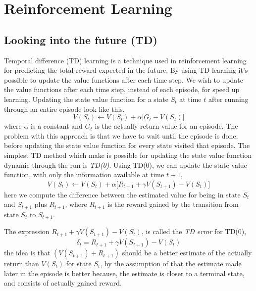 \documentclass[11pt]{article}
\begin{document}
\maketitle

\section{Reinforcement Learning}



\subsection{Looking into the future (TD)}

Temporal difference (TD) learning is a technique used in reinforcement learning for predicting the total reward expected in the future. By using TD learning it's possible to update the value functions after each time step. We wish to update the value functions after each time step, instead of each episode, for speed up learning. Updating the state value function for a state $S_{t}$ at time $t$ after running through an entire episode look like this,
\begin{equation}\label{eq:td}
    V(S_{t}) \leftarrow V(S_{t}) + \alpha \big[G_{t} - V(S_{t}) \big]
\end{equation}
where $\alpha$ is a constant and $G_{t}$ is the actually return value for an episode. The problem with this approach is that we have to wait until the episode is done, before updating the state value function for every state visited that episode. The simplest TD method which make is possible for updating the state value function dynamic through the run is \textit{TD(0)}. 
Using TD(0), we can update the state value function, with only the information available at time $t + 1$,
\begin{equation}\label{eq:td2}
    V(S_{t}) \leftarrow V(S_{t}) + \alpha \big[R_{t + 1} + \gamma V(S_{t + 1}) - V(S_{t}) \big]
\end{equation}
here we compute the difference between the estimated value for being in state $S_{t}$ and $S_{t + 1}$ plus $R_{t + 1}$, where $R_{t + 1}$ is the reward gained by the transition from state $S_{t}$ to $S_{t + 1}$.

The expression $R_{t + 1} + \gamma V(S_{t + 1}) - V(S_{t})$, is called the \textit{TD error} for TD(0), 
\begin{equation}
    \delta_{t} = R_{t + 1} + \gamma V(S_{t + 1}) - V(S_{t})
\end{equation}
the idea is that $(V(S_{t + 1}) + R_{t + 1})$ should be a better estimate of the actually return than $V(S_{t})$ for state $S_{t}$, by the assumption of that the estimate made later in the episode is better because, the estimate is closer to a terminal state, and consists of actually gained reward. 
\end{document}
